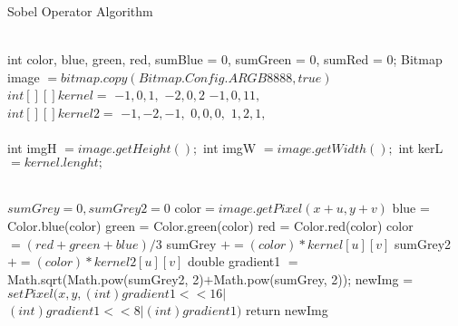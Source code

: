 \documentclass[11pt]{article}
\begin{document}
\begin{algorithm}
   \caption{Sobel Operator Algorithm}
    \begin{algorithmic}[1]
		\\
        \State int color, blue, green, red, sumBlue = 0, sumGreen = 0,				 \State sumRed = 0;
        \State  Bitmap image $= bitmap.copy(Bitmap.Config.ARGB8888, true)$
\\
		\State $int[ ][ ] kernel =$
          \State ${-1, 0, 1},$
          \State ${-2, 0, 2}$
                        \State ${-1, 0, 11},$
                        \\
                        \State $int[ ][ ] kernel2 =$
          \State ${-1, -2, -1},$
          \State ${0,0,0},$
                        \State ${1,2,1},$
                        \\
                        \\
         \State int imgH $= image.getHeight(); $
        \State int imgW $= image.getWidth(); $
       \State int kerL $= kernel.lenght; $
        
\\
            \State $sumGrey = 0, sumGrey2 = 0$
						\State color$= image.getPixel(x+u,y+v)$
						\State blue = Color.blue(color)
            				\State green = Color.green(color)
            				\State red = Color.red(color)
            				\State color $= (red+green+blue)/3$
            				\State sumGrey $+= (color) * kernel[u][v]$
            				\State sumGrey2 $+= (color) * kernel2[u][v]$
            			\EndFor
				\EndFor
				\State double gradient1 
				\State $=$ Math.sqrt(Math.pow(sumGrey2, 2)$+$Math.pow(sumGrey, 2));
				\State newImg = $ setPixel(x, y,  (int)gradient1<<16 | $ 
				\State $(int)gradient1<<8 | (int)gradient1)$
        		\EndFor
        \EndFor
        \State return newImg
       \EndFunction

\end{algorithmic}
\end{algorithm}
\end{document}
